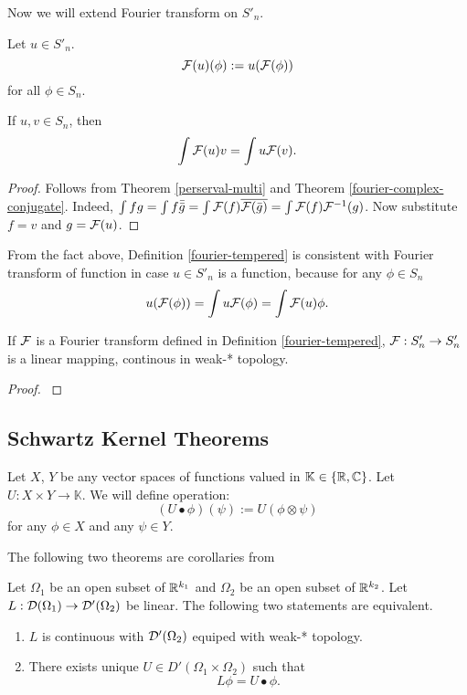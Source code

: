 \documentclass[main.tex]{subfiles}
\begin{document}
Now we will extend Fourier transform on $S'_n$.
\begin{definition}
\label{fourier-tempered}
Let $u\in S'_n$.
\begin{equation}
\mathcal{F}(u)(\phi) := u(\mathcal{F}(\phi))
\end{equation}
for all $\phi \in S_n$.
\end{definition}
\begin{fact}
If $u,v\in S_n$, then
\begin{equation}
\int \mathcal{F}(u)v = \int u\mathcal{F}(v). 
\end{equation}
\end{fact}
\begin{proof}
Follows from Theorem \ref{perserval-multi} and Theorem \ref{fourier-complex-conjugate}.
Indeed, 
$\int fg = \int f\bar{\bar{g}} = \int \mathcal{F}(f)\overline{\mathcal{F}(\bar{g})}=\int \mathcal{F}(f){\mathcal{F}}^{-1}(g)$. Now substitute $f = v$ and $g=\mathcal{F}(u)$.
\end{proof}
From the fact above, Definition \ref{fourier-tempered} is consistent with Fourier transform of function in case $u\in S'_n$ is a function, because for any $\phi\in S_n$
\begin{equation}
u(\mathcal{F}(\phi)) = \int u\mathcal{F}(\phi) = \int \mathcal{F}(u) \phi. 
\end{equation}
\begin{theorem}
If $\mathcal{F}$ is a Fourier transform defined in Definition \ref{fourier-tempered}, $\mathcal{F}:S'_n\to S'_n$ is a linear mapping, continous in weak-* topology.
\end{theorem}
\begin{proof}
\cite[see][7.15]{rudin1991}
\end{proof}
\subsection{Schwartz Kernel Theorems}
\begin{definition}
Let $X$, $Y$ be any vector spaces of functions valued in $\mathbb{K}\in\{\mathbb{R}, \mathbb{C}\}$.
Let $U:X\times Y \to \mathbb{K}$.
We will define operation:
\begin{equation}
(U\bullet \phi)(\psi) := U(\phi\otimes\psi) 
\end{equation}
for any $\phi\in X$ and any $\psi\in Y$.
\end{definition}

The following two theorems are corollaries from \cite[51. Examples of Nuclear Spaces. The Kernels Theorem]{treves1970}

\begin{theorem}
Let $\Omega_1$ be an open subset of $\mathbb{R}^{k_1}$ and $\Omega_2$ be an open subset of $\mathbb{R}^{k_2}$.
Let $L:\mathcal{D}(\Omega_1)\to \mathcal{D}'(\Omega_2)$ be linear.
The following two statements are equivalent.
\begin{enumerate}
\item
$L$ is continuous with $\mathcal{D}'(\Omega_2)$ equiped with weak-* topology.
\item
There exists unique $U\in D'(\Omega_1\times\Omega_2)$ such that
\begin{equation}
L\phi = U\bullet \phi.
\end{equation} 
\end{enumerate} 
\end{theorem}
\end{document}
